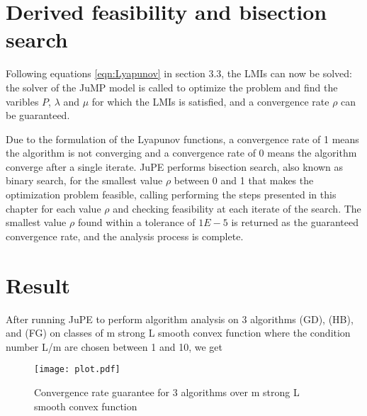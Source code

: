 \section{Derived feasibility and bisection search}
Following equations \ref{eqn:Lyapunov} in section 3.3, the LMIs can now be solved: the solver of the JuMP model is called to optimize the problem and find the varibles $P$, $\lambda$ and $\mu$ for which the LMIs is satisfied, and a convergence rate $\rho$ can be guaranteed.

Due to the formulation of the Lyapunov functions, a convergence rate of 1 means the algorithm is not converging and a convergence rate of 0 means the algorithm converge after a single iterate. JuPE performs bisection search, also known as binary search, for the smallest value $\rho$ between 0 and 1 that makes the optimization problem feasible, calling performing the steps presented in this chapter for each value $\rho$ and checking feasibility at each iterate of the search. The smallest value $\rho$ found within a tolerance of $1E-5$ is returned as the guaranteed convergence rate, and the analysis process is complete.

\section{Result}
After running JuPE to perform algorithm analysis on 3 algorithms (GD), (HB), and (FG) on classes of m strong L smooth convex function where the condition number L/m are chosen between 1 and 10, we get 
\begin{figure}[h]
    \centering
    \texttt{[image: plot.pdf]}
    \caption{Convergence rate guarantee for 3 algorithms over m strong L smooth convex function}
    \label{plot_result}
\end{figure}